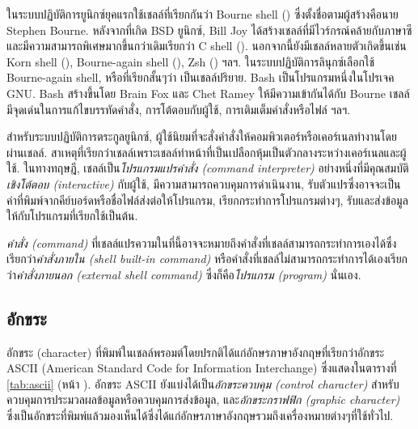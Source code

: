 \begin{thwbr}
ในระบบปฏิบัติการยูนิกซ์ยุคแรกใช้เชลล์ที่เรียกกันว่า Bourne shell () ซึ่งตั้งชื่อตามผู้สร้างคือนาย Stephen Bourne. หลังจากที่เกิด BSD ยูนิกซ์, Bill Joy ได้สร้างเชลล์ที่มีไวร์กรณ์คล้ายกับภาษาซีและมีความสามารถพิเศษมากขึ้นกว่าเดิมเรียกว่า C shell (). นอกจากนี้ยังมีเชลล์หลายตัวเกิดขึ้นเช่น Korn shell (), Bourne-again shell (), Zsh () ฯลฯ. ในระบบปฏิบัติการลินุกซ์เลือกใช้ Bourne-again shell, หรือที่เรียกสั้นๆว่า  เป็นเชลล์ปริยาย. Bash เป็นโปรแกรมหนึ่งในโปรเจค GNU. Bash สร้างขึ้นโดย Brain Fox และ Chet Ramey ให้มีความเข้ากันได้กับ Bourne เชลล์มีจุดเด่นในการแก้ไขบรรทัดคำสั่ง, การโต้ตอบกับผู้ใช้, การเติมเต็มคำสั่งหรือไฟล์ ฯลฯ.

สำหรับระบบปฏิบัติการตระกูลยูนิกซ์, ผู้ใช้นิยมที่จะสั่งคำสั่งให้คอมพิวเตอร์หรือเคอร์เนลทำงานโดยผ่านเชลล์. สาเหตุที่เรียกว่าเชลล์เพราะเชลล์ทำหน้าที่เป็นเปลือกหุ้มเป็นตัวกลางระหว่างเคอร์เนลและผู้ใช้. ในทางทฤษฎี, เชลล์เป็น\emph{โปรแกรมแปรคำสั่ง (command interpreter)} อย่างหนึ่งที่มีคุณสมบัติ\emph{เชิงโต้ตอบ (interactive)} กับผู้ใช้, มีความสามารถควบคุมการดำเนินงาน, รับตัวแปรซึ่งอาจจะเป็นค่าที่พิมพ์จากคีย์บอร์ดหรือชื่อไฟล์ส่งต่อให้โปรแกรม, เรียกกระทำการโปรแกรมต่างๆ, รับและส่งข้อมูลให้กับโปรแกรมที่เรียกใช้เป็นต้น. 

\emph{คำสั่ง (command)} %
ที่เชลล์แปรความในที่นี้อาจจะหมายถึงคำสั่งที่เชลล์สามารถกระทำการเองได้ซึ่งเรียกว่า\emph{คำสั่งภายใน (shell built-in command)} %
%
หรือคำสั่งที่เชลล์ไม่สามารถกระทำการได้เองเรียกว่า\emph{คำสั่งภายนอก (external shell command)} ซึ่งก็คือ\emph{โปรแกรม (program)} นั่นเอง. 

\subsection{อักขระ}
อักขระ (character) ที่พิมพ์ในเชลล์พรอมต์โดยปรกติได้แก่อักษรภาษาอังกฤษที่เรียกว่าอักขระ ASCII (American Standard Code for Information Interchange) ซึ่งแสดงในตารางที่ \ref{tab:ascii} (หน้า \pageref{tab:ascii}). อักขระ ASCII ยังแบ่งได้เป็น\emph{อักขระควบคุม (control character)} สำหรับควบคุมการประมวลผลข้อมูลหรือควบคุมการส่งข้อมูล, และ\emph{อักขระกราฟฟิก (graphic character)} ซึ่งเป็นอักขระที่พิมพ์แล้วมองเห็นได้ซึ่งได้แก่อักษรภาษาอังกฤษรวมถึงเครื่องหมายต่างๆที่ใช้ทั่วไป.


\end{thwbr}
